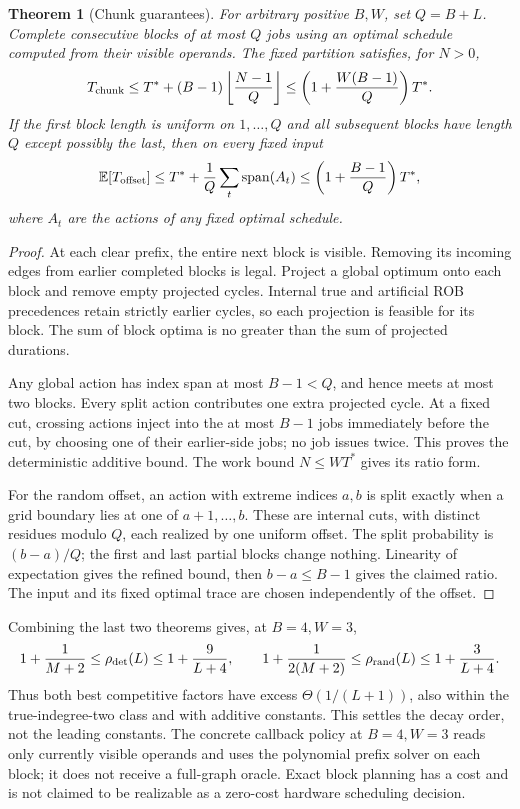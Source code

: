 \documentclass[11pt]{article}
\newtheorem{theorem}{Theorem}
\newcommand{\T}{T^*}
\begin{document}
\begin{theorem}[Chunk guarantees]
For arbitrary positive $B,W$, set $Q=B+L$. Complete consecutive blocks
of at most $Q$ jobs using an optimal schedule computed from their visible
operands. The fixed partition satisfies, for $N>0$,
\[
 T_{\rm chunk}\le\T+(B-1)\left\lfloor\frac{N-1}{Q}\right\rfloor
 \le\left(1+\frac{W(B-1)}Q\right)\T.
\]
If the first block length is uniform on $1,\ldots,Q$ and all subsequent
blocks have length $Q$ except possibly the last, then on every fixed input
\[
 \mathbb E[T_{\rm offset}]
 \le\T+\frac1Q\sum_t\operatorname{span}(A_t)
 \le\left(1+\frac{B-1}Q\right)\T,
\]
where $A_t$ are the actions of any fixed optimal schedule.
\end{theorem}
\begin{proof}
At each clear prefix, the entire next block is visible. Removing its
incoming edges from earlier completed blocks is legal. Project a global
optimum onto each block and remove empty projected cycles. Internal true
and artificial ROB precedences retain strictly earlier cycles, so each
projection is feasible for its block. The sum of block optima is no
greater than the sum of projected durations.

Any global action has index span at most $B-1<Q$, and hence meets at
most two blocks. Every split action contributes one extra projected
cycle. At a fixed cut, crossing actions inject into the at most $B-1$
jobs immediately before the cut, by choosing one of their earlier-side
jobs; no job issues twice. This proves the deterministic additive bound.
The work bound $N\le W\T$ gives its ratio form.

For the random offset, an action with extreme indices $a,b$ is split
exactly when a grid boundary lies at one of $a+1,\ldots,b$. These are
internal cuts, with distinct residues modulo $Q$, each realized by
one uniform offset. The split probability is $(b-a)/Q$; the first and
last partial blocks change nothing. Linearity of expectation gives the
refined bound, then $b-a\le B-1$ gives the claimed ratio. The input
and its fixed optimal trace are chosen independently of the offset.
\end{proof}

Combining the last two theorems gives, at $B=4,W=3$,
\[
 1+\frac1{M+2}\le\rho_{\rm det}(L)\le1+\frac9{L+4},\qquad
 1+\frac1{2(M+2)}\le\rho_{\rm rand}(L)\le1+\frac3{L+4}.
\]
Thus both best competitive factors have excess $\Theta(1/(L+1))$,
also within the true-indegree-two class and with additive constants.
This settles the decay order, not the leading constants. The concrete
callback policy at $B=4,W=3$ reads only currently visible operands and
uses the polynomial prefix solver on each block; it does not receive a
full-graph oracle. Exact block planning has a cost and is not claimed to
be realizable as a zero-cost hardware scheduling decision.
\end{document}
